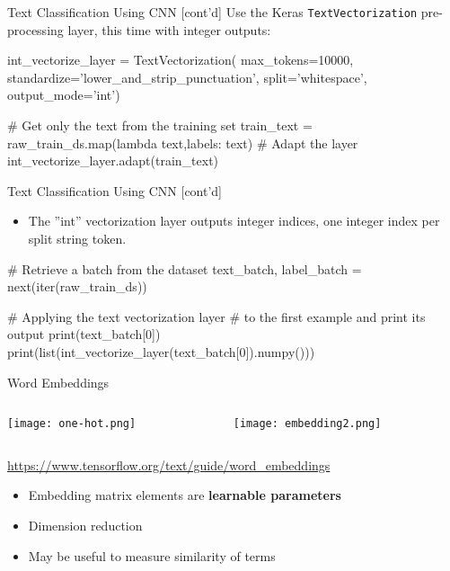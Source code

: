 \documentclass[ignorenonframetext,xcolor=x11names]{beamer}
\begin{document}
\begin{frame}[fragile]{Text Classification Using CNN \small [cont'd]}
Use the Keras \texttt{TextVectorization} pre-processing layer, this time with integer outputs:
\begin{pythoncode}
int_vectorize_layer = TextVectorization(
    max_tokens=10000,
    standardize='lower_and_strip_punctuation',
    split='whitespace',
    output_mode='int')
    
# Get only the text from the training set
train_text = raw_train_ds.map(lambda text,labels: text)
# Adapt the layer
int_vectorize_layer.adapt(train_text)
\end{pythoncode}
\end{frame}


\begin{frame}[fragile]{Text Classification Using CNN \small [cont'd]}
\begin{itemize}
   \item The ''int'' vectorization layer outputs integer indices, one integer index per split string token. 
\end{itemize}

\begin{pythoncode}
# Retrieve a batch from the dataset
text_batch, label_batch = next(iter(raw_train_ds))

# Applying the text vectorization layer 
# to the first example and print its output
print(text_batch[0])
print(list(int_vectorize_layer(text_batch[0]).numpy()))
\end{pythoncode}
\end{frame}

\begin{frame}{Word Embeddings}
\begin{columns}
\begin{column}{.5\textwidth}
\texttt{[image: one-hot.png]}
\end{column}
\begin{column}{.5\textwidth}
\texttt{[image: embedding2.png]}
\end{column}
\end{columns}
\begin{center}
\vspace{\baselineskip}
\scriptsize \url{https://www.tensorflow.org/text/guide/word_embeddings}\normalsize
\vspace{\baselineskip}
\end{center}
\begin{itemize}
   \item Embedding matrix elements are \textbf{learnable parameters}
   \item Dimension reduction
   \item May be useful to measure similarity of terms
\end{itemize}
\end{frame}
\end{document}
